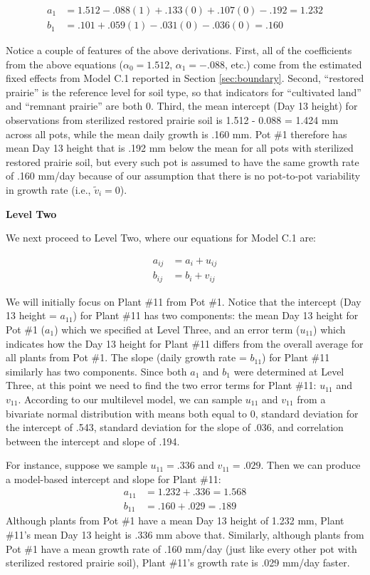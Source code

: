 \documentclass[
]{krantz}
\begin{document}
\begin{align*}
a_{1} & = 1.512-.088(1)+.133(0)+.107(0)-.192 = 1.232 \\
b_{1} & = .101+.059(1)-.031(0)-.036(0) = .160
\end{align*}

Notice a couple of features of the above derivations. First, all of the coefficients from the above equations (\(\alpha_{0}=1.512\), \(\alpha_{1}=-.088\), etc.) come from the estimated fixed effects from Model C.1 reported in Section \ref{sec:boundary}. Second, ``restored prairie'' is the reference level for soil type, so that indicators for ``cultivated land'' and ``remnant prairie'' are both 0. Third, the mean intercept (Day 13 height) for observations from sterilized restored prairie soil is 1.512 - 0.088 = 1.424 mm across all pots, while the mean daily growth is .160 mm. Pot \#1 therefore has mean Day 13 height that is .192 mm below the mean for all pots with sterilized restored prairie soil, but every such pot is assumed to have the same growth rate of .160 mm/day because of our assumption that there is no pot-to-pot variability in growth rate (i.e., \(\tilde{v}_{i}=0\)).

\textbf{Level Two}

We next proceed to Level Two, where our equations for Model C.1 are:

\begin{align*}
a_{ij} & = a_{i}+u_{ij} \\
b_{ij} & = b_{i}+v_{ij}
\end{align*}

We will initially focus on Plant \#11 from Pot \#1. Notice that the intercept (Day 13 height = \(a_{11}\)) for Plant \#11 has two components: the mean Day 13 height for Pot \#1 (\(a_{1}\)) which we specified at Level Three, and an error term (\(u_{11}\)) which indicates how the Day 13 height for Plant \#11 differs from the overall average for all plants from Pot \#1. The slope (daily growth rate = \(b_{11}\)) for Plant \#11 similarly has two components. Since both \(a_{1}\) and \(b_{1}\) were determined at Level Three, at this point we need to find the two error terms for Plant \#11: \(u_{11}\) and \(v_{11}\). According to our multilevel model, we can sample \(u_{11}\) and \(v_{11}\) from a bivariate normal distribution with means both equal to 0, standard deviation for the intercept of .543, standard deviation for the slope of .036, and correlation between the intercept and slope of .194.

For instance, suppose we sample \(u_{11}=.336\) and \(v_{11}=.029\). Then we can produce a model-based intercept and slope for Plant \#11:
\begin{align*}
a_{11} & = 1.232+.336 = 1.568 \\
b_{11} & = .160+.029 = .189
\end{align*}
Although plants from Pot \#1 have a mean Day 13 height of 1.232 mm, Plant \#11's mean Day 13 height is .336 mm above that. Similarly, although plants from Pot \#1 have a mean growth rate of .160 mm/day (just like every other pot with sterilized restored prairie soil), Plant \#11's growth rate is .029 mm/day faster.
\end{document}
